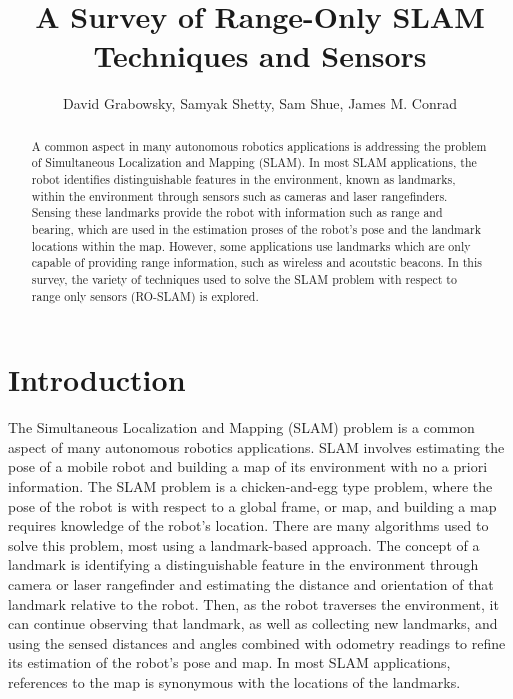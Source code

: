 \documentclass[conference]{IEEEtran}
\begin{document}
	\title{A Survey of Range-Only SLAM Techniques and Sensors}
	
	
	
	\author{David Grabowsky, Samyak Shetty, Sam Shue, James M. Conrad}
	
	
	
	
	
	
	
	
	
	
	\maketitle
	
	
	
	
	
	\begin{abstract}
		
		
		
		
A common aspect in many autonomous robotics applications is addressing the problem of Simultaneous Localization and Mapping (SLAM). In most SLAM applications, the robot identifies distinguishable features in the environment, known as landmarks, within the environment through sensors such as cameras and laser rangefinders. Sensing these landmarks provide the robot with information such as range and bearing, which are used in the estimation proses of the robot's pose and the landmark locations within the map. However, some applications use landmarks which are only capable of providing range information, such as wireless and acoutstic beacons. In this survey, the variety of techniques used to solve the SLAM problem with respect to range only sensors (RO-SLAM) is explored.
		
		
	\end{abstract}
	
	
	
	
	
	
	
	\section{Introduction} 
		The Simultaneous Localization and Mapping (SLAM) problem is a common aspect of many autonomous robotics applications. SLAM involves estimating the pose of a mobile robot and building a map of its environment with no a priori information. The SLAM problem is a chicken-and-egg type problem, where the pose of the robot is with respect to a global frame, or map, and building a map requires knowledge of the robot's location. There are many algorithms used to solve this problem, most using a landmark-based approach. The concept of a landmark is identifying a distinguishable feature in the environment through camera or laser rangefinder and estimating the distance and orientation of that landmark relative to the robot. Then, as the robot traverses the environment, it can continue observing that landmark, as well as collecting new landmarks, and using the sensed distances and angles combined with odometry readings to refine its estimation of the robot's pose and map. In most SLAM applications, references to the map is synonymous with the locations of the landmarks.
	
\end{document}
